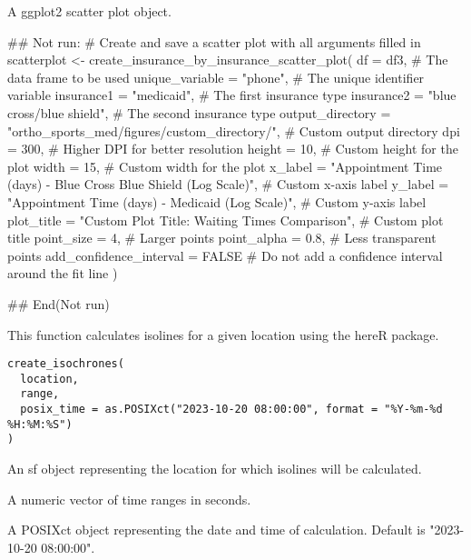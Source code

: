 \documentclass[a4paper]{book}
\begin{document}
%
\begin{Value}
A ggplot2 scatter plot object.
\end{Value}
%
\begin{Examples}
\begin{ExampleCode}
## Not run: 
# Create and save a scatter plot with all arguments filled in
scatterplot <- create_insurance_by_insurance_scatter_plot(
  df = df3,  # The data frame to be used
  unique_variable = "phone",  # The unique identifier variable
  insurance1 = "medicaid",  # The first insurance type
  insurance2 = "blue cross/blue shield",  # The second insurance type
  output_directory = "ortho_sports_med/figures/custom_directory/",  # Custom output directory
  dpi = 300,  # Higher DPI for better resolution
  height = 10,  # Custom height for the plot
  width = 15,  # Custom width for the plot
  x_label = "Appointment Time (days) - Blue Cross Blue Shield (Log Scale)",  # Custom x-axis label
  y_label = "Appointment Time (days) - Medicaid (Log Scale)",  # Custom y-axis label
  plot_title = "Custom Plot Title: Waiting Times Comparison",  # Custom plot title
  point_size = 4,  # Larger points
  point_alpha = 0.8,  # Less transparent points
  add_confidence_interval = FALSE  # Do not add a confidence interval around the fit line
)

## End(Not run)

\end{ExampleCode}
\end{Examples}
%
\begin{Description}
This function calculates isolines for a given location using the hereR package.
\end{Description}
%
\begin{Usage}
\begin{verbatim}
create_isochrones(
  location,
  range,
  posix_time = as.POSIXct("2023-10-20 08:00:00", format = "%Y-%m-%d %H:%M:%S")
)
\end{verbatim}
\end{Usage}
%
\begin{Arguments}
\begin{ldescription}
\item[\code{location}] An sf object representing the location for which isolines will be calculated.

\item[\code{range}] A numeric vector of time ranges in seconds.

\item[\code{posix\_time}] A POSIXct object representing the date and time of calculation. Default is "2023-10-20 08:00:00".
\end{ldescription}
\end{Arguments}
\end{document}
